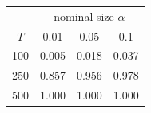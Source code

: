 % 
\begin{tabular}{cccc}
  \hline
  & \multicolumn{3}{c}{nominal size $\alpha$} \\
 $T$ & 0.01 & 0.05 & 0.1 \\
 \hline
100 & 0.005 & 0.018 & 0.037 \\ 
  250 & 0.857 & 0.956 & 0.978 \\ 
  500 & 1.000 & 1.000 & 1.000 \\ 
   \hline
\end{tabular}
